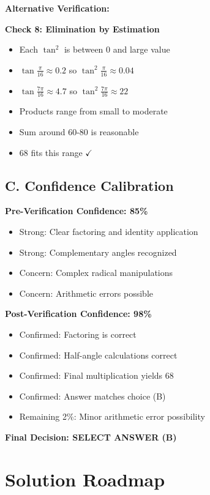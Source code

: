 \documentclass[12pt]{article}
\begin{document}
\begin{verificationbox}
\textbf{Alternative Verification:}

\textbf{Check 8: Elimination by Estimation}
\begin{itemize}
    \item Each $\tan^2$ is between 0 and large value
    \item $\tan\frac{\pi}{16} \approx 0.2$ so $\tan^2\frac{\pi}{16} \approx 0.04$
    \item $\tan\frac{7\pi}{16} \approx 4.7$ so $\tan^2\frac{7\pi}{16} \approx 22$
    \item Products range from small to moderate
    \item Sum around 60-80 is reasonable
    \item 68 fits this range $\checkmark$
\end{itemize}

\subsection*{C. Confidence Calibration}

\textbf{Pre-Verification Confidence: 85\%}
\begin{itemize}
    \item Strong: Clear factoring and identity application
    \item Strong: Complementary angles recognized
    \item Concern: Complex radical manipulations
    \item Concern: Arithmetic errors possible
\end{itemize}

\textbf{Post-Verification Confidence: 98\%}
\begin{itemize}
    \item Confirmed: Factoring is correct
    \item Confirmed: Half-angle calculations correct
    \item Confirmed: Final multiplication yields 68
    \item Confirmed: Answer matches choice (B)
    \item Remaining 2\%: Minor arithmetic error possibility
\end{itemize}

\textbf{Final Decision: SELECT ANSWER (B)}

\end{verificationbox}

\section{Solution Roadmap}
\end{document}
